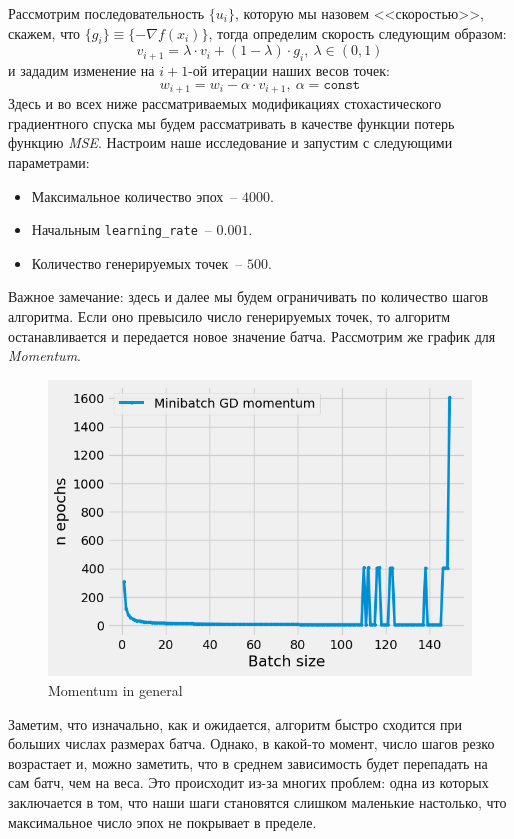 \documentclass[12pt, a4paper, oneside, final]{article}
\begin{document}
	Рассмотрим последовательность $\{u_{i}\}$, которую мы назовем <<скоростью>>, скажем, что $\{g_{i}\} \equiv \{-\nabla{f(x_{i})}\}$, тогда определим скорость следующим образом:
	\[
		v_{i + 1} = \lambda \cdot v_{i} + (1 - \lambda) \cdot g_{i}, ~ \lambda \in (0, 1)
	\] и зададим изменение на $i + 1$-ой итерации наших весов точек:
	\[
		w_{i + 1} = w_{i} - \alpha \cdot v_{i + 1}, ~ \alpha = \mathtt{const}
	\]
	Здесь и во всех ниже рассматриваемых модификациях стохастического градиентного спуска мы будем рассматривать в качестве функции потерь функцию \textit{MSE}.
	Настроим наше исследование и запустим с следующими параметрами:
	\begin{itemize}
		\item Максимальное количество эпох~-- $4000$.
		\item Начальным \texttt{learning\_rate}~-- $0.001$.
		\item Количество генерируемых точек~-- $500$.
	\end{itemize}
	Важное замечание: здесь и далее мы будем ограничивать по количество шагов алгоритма.
	Если оно превысило число генерируемых точек, то алгоритм останавливается и передается новое значение батча.
	Рассмотрим же график для \textit{Momentum}.
	\begin{figure}[H]
		\centering
		\includegraphics[scale = 0.78]{Image/T3_MOMENTUM_GENERAL.png}
		\caption*{Momentum in general}
	\end{figure}
	Заметим, что изначально, как и ожидается, алгоритм быстро сходится при больших числах размерах батча.
	Однако, в какой-то момент, число шагов резко возрастает и, можно заметить, что в среднем зависимость будет перепадать на сам батч, чем на веса.
	Это происходит из-за многих проблем: одна из которых заключается в том, что наши шаги становятся слишком маленькие настолько, что максимальное число эпох не покрывает в пределе.
\end{document}
